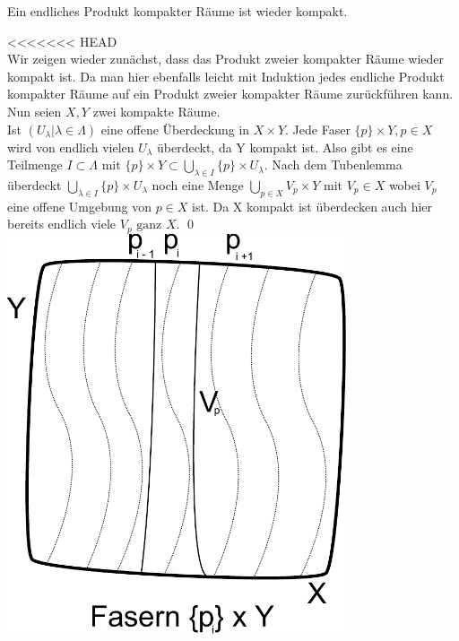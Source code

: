 \begin{Satz}
	Ein endliches Produkt kompakter Räume ist wieder kompakt.
\end{Satz}
<<<<<<< HEAD
	\\
	Wir zeigen wieder zunächst, dass das Produkt zweier kompakter Räume wieder kompakt ist. Da man hier ebenfalls leicht mit Induktion jedes endliche Produkt kompakter Räume 
	auf ein Produkt zweier kompakter Räume zurückführen kann. \\
	Nun seien \(X, Y\) zwei kompakte Räume.\\
	Ist \((U_{\lambda} | \lambda \in \Lambda) \) eine offene Überdeckung in \(X \times Y \). Jede Faser \( \{p\} \times Y, p \in X \) wird von endlich vielen \(U_{\lambda} \) überdeckt,
	da Y kompakt ist. Also gibt es eine Teilmenge \( I \subset \Lambda \) mit \( \{p\} \times Y \subset \bigcup_{ \lambda \in I } \{p\} \times U_{\lambda} \). 
	Nach dem Tubenlemma überdeckt \( \bigcup_{ \lambda \in I } \{p\} \times U_{\lambda} \) noch eine Menge \(\bigcup_{ p \in X } V_{p} \times Y \mbox{ mit } V_{p} \in X \) 
	wobei \( V_{p} \) eine offene Umgebung von \( p \in X \) ist. Da X kompakt ist überdecken auch hier bereits endlich viele \(V_{p} \mbox{ ganz } X \). 
	\qed\\
	\includegraphics[width=10cm]{produkt_kompakter_raueme.pdf}
	
